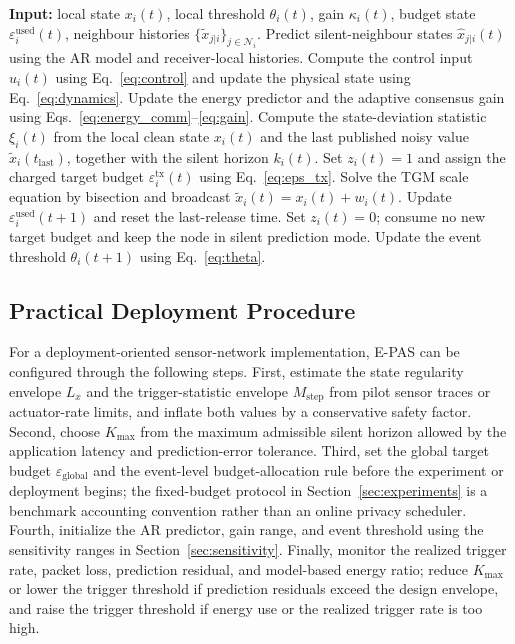\documentclass[10pt]{article}
\newcommand{\EPAS}{E-PAS}
\newcommand{\AR}{AR}
\newcommand{\egl}{\varepsilon_{\text{global}}}
\newcommand{\Mstep}{M_{\text{step}}}
\begin{document}
\begin{algorithm}[htbp]
\caption{Node-level E-PAS update at node $i$}
\label{alg:epas}
\begin{algorithmic}[1]
\STATE \textbf{Input:} local state $x_i(t)$, local threshold $\theta_i(t)$, gain $\kappa_i(t)$, budget state $\varepsilon_i^{\mathrm{used}}(t)$, neighbour histories $\{\tilde{x}_{j|i}\}_{j\in\mathcal{N}_i}$.
\STATE Predict silent-neighbour states $\hat{x}_{j|i}(t)$ using the AR model and receiver-local histories.
\STATE Compute the control input $u_i(t)$ using Eq.~\eqref{eq:control} and update the physical state using Eq.~\eqref{eq:dynamics}.
\STATE Update the energy predictor and the adaptive consensus gain using Eqs.~\eqref{eq:energy_comm}--\eqref{eq:gain}.
\STATE Compute the state-deviation statistic $\xi_i(t)$ from the local clean state $x_i(t)$ and the last published noisy value $\tilde{x}_i(t_{\mathrm{last}})$, together with the silent horizon $k_i(t)$.
  \STATE Set $z_i(t)=1$ and assign the charged target budget $\varepsilon_i^{\mathrm{tx}}(t)$ using Eq.~\eqref{eq:eps_tx}.
  \STATE Solve the TGM scale equation by bisection and broadcast $\tilde{x}_i(t)=x_i(t)+w_i(t)$.
  \STATE Update $\varepsilon_i^{\mathrm{used}}(t+1)$ and reset the last-release time.
\ELSE
  \STATE Set $z_i(t)=0$; consume no new target budget and keep the node in silent prediction mode.
\ENDIF
\STATE Update the event threshold $\theta_i(t+1)$ using Eq.~\eqref{eq:theta}.
\end{algorithmic}
\end{algorithm}

\subsection{Practical Deployment Procedure}

For a deployment-oriented sensor-network implementation, \EPAS{} can be configured through the following steps. First, estimate the state regularity envelope $L_x$ and the trigger-statistic envelope $\Mstep$ from pilot sensor traces or actuator-rate limits, and inflate both values by a conservative safety factor. Second, choose $K_{\max}$ from the maximum admissible silent horizon allowed by the application latency and prediction-error tolerance. Third, set the global target budget $\egl$ and the event-level budget-allocation rule before the experiment or deployment begins; the fixed-budget protocol in Section~\ref{sec:experiments} is a benchmark accounting convention rather than an online privacy scheduler. Fourth, initialize the \AR{} predictor, gain range, and event threshold using the sensitivity ranges in Section~\ref{sec:sensitivity}. Finally, monitor the realized trigger rate, packet loss, prediction residual, and model-based energy ratio; reduce $K_{\max}$ or lower the trigger threshold if prediction residuals exceed the design envelope, and raise the trigger threshold if energy use or the realized trigger rate is too high.
\end{document}
